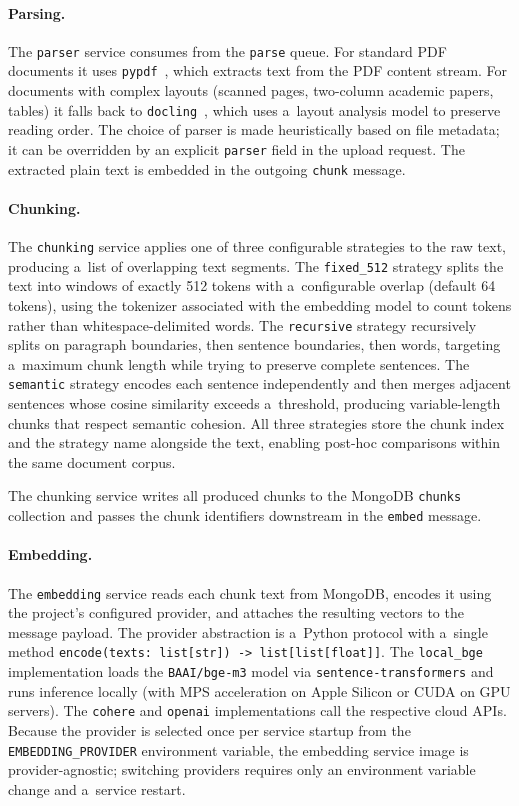 \paragraph{Parsing.}
The \texttt{parser} service consumes from the \texttt{parse} queue.  For
standard PDF documents it uses \texttt{pypdf}~\cite{pypdf}, which extracts
text from the PDF content stream.  For documents with complex layouts
(scanned pages, two-column academic papers, tables) it falls back to
\texttt{docling}~\cite{docling2024}, which uses a~layout analysis model to
preserve reading order.  The choice of parser is made heuristically based
on file metadata; it can be overridden by an explicit \texttt{parser}
field in the upload request.  The extracted plain text is embedded in the
outgoing \texttt{chunk} message.

\paragraph{Chunking.}
The \texttt{chunking} service applies one of three configurable strategies
to the raw text, producing a~list of overlapping text segments.  The
\texttt{fixed\_512} strategy splits the text into windows of exactly 512
tokens with a~configurable overlap (default 64 tokens), using the tokenizer
associated with the embedding model to count tokens rather than
whitespace-delimited words.  The \texttt{recursive} strategy recursively
splits on paragraph boundaries, then sentence boundaries, then words,
targeting a~maximum chunk length while trying to preserve complete sentences.
The \texttt{semantic} strategy encodes each sentence independently and then
merges adjacent sentences whose cosine similarity exceeds a~threshold,
producing variable-length chunks that respect semantic cohesion.  All three
strategies store the chunk index and the strategy name alongside the text,
enabling post-hoc comparisons within the same document corpus.

The chunking service writes all produced chunks to the MongoDB
\texttt{chunks} collection and passes the chunk identifiers downstream in
the \texttt{embed} message.

\paragraph{Embedding.}
The \texttt{embedding} service reads each chunk text from MongoDB, encodes
it using the project's configured provider, and attaches the resulting
vectors to the message payload.  The provider abstraction is a~Python
protocol with a~single method \texttt{encode(texts: list[str]) -> list[list[float]]}.
The \texttt{local\_bge} implementation loads the
\texttt{BAAI/bge-m3} model via \texttt{sentence-transformers} and runs
inference locally (with MPS acceleration on Apple Silicon or CUDA on GPU
servers).  The \texttt{cohere} and \texttt{openai} implementations call
the respective cloud APIs.  Because the provider is selected once per
service startup from the \texttt{EMBEDDING\_PROVIDER} environment variable,
the embedding service image is provider-agnostic; switching providers requires
only an environment variable change and a~service restart.

